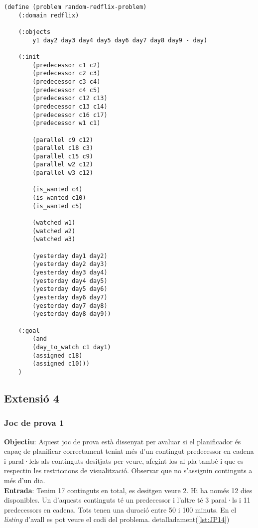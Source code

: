 \documentclass[a4paper]{article}
\begin{document}
	\begin{lstlisting}[language=PDDL, caption={Joc de Prova Random - Extensió 3}, label={lst:JPR3}]                  
	(define (problem random-redflix-problem)
	(:domain redflix)
	
	(:objects
		y1 day2 day3 day4 day5 day6 day7 day8 day9 - day)
	
	(:init
		(predecessor c1 c2)
		(predecessor c2 c3)
		(predecessor c3 c4)
		(predecessor c4 c5)
		(predecessor c12 c13)
		(predecessor c13 c14)
		(predecessor c16 c17)
		(predecessor w1 c1)
		
		(parallel c9 c12)
		(parallel c18 c3)
		(parallel c15 c9)
		(parallel w2 c12)
		(parallel w3 c12)
		
		(is_wanted c4)
		(is_wanted c10)
		(is_wanted c5)
		
		(watched w1)
		(watched w2)
		(watched w3)
		
		(yesterday day1 day2)
		(yesterday day2 day3)
		(yesterday day3 day4)
		(yesterday day4 day5)
		(yesterday day5 day6)
		(yesterday day6 day7)
		(yesterday day7 day8)
		(yesterday day8 day9))
	
	(:goal
		(and
		(day_to_watch c1 day1)
		(assigned c18)
		(assigned c10)))
	)	
	\end{lstlisting}
	
	\subsection{Extensió 4}
	\subsubsection*{Joc de prova 1}
	
	\noindent \textbf{Objectiu}: Aquest joc de prova està dissenyat per avaluar si el planificador és capaç de planificar correctament tenint més d'un contingut predecessor en cadena i paral·lels als continguts desitjats per veure, afegint-los al pla també i que es respectin les restriccions de visualització. Observar que no s'assignin continguts a més d'un dia.  \\
	
	\noindent \textbf{Entrada}: Tenim 17 continguts en total, es desitgen veure 2. Hi ha només 12 dies disponibles. Un d'aquests continguts té un predecessor i l'altre té 3 paral·ls i 11 predecessors en cadena. Tots tenen una duració entre 50 i 100 minuts. En el \textit{listing} d'avall es pot veure el codi del problema.  detalladament(\ref{lst:JP14}) \\
	
\end{document}
